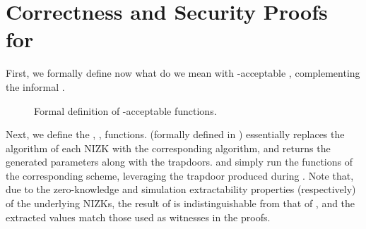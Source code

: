 \section{Correctness and Security Proofs for \CUASGen}
\label{app:uas-proofs}

First, we formally define now what do we mean with \UAS-acceptable \fissue,
complementing the informal . 

\begin{figure}[ht!]
  \centering  
  \label{fig:uas-acceptable}
  \caption{Formal definition of \UAS-acceptable \fissue functions.}
\end{figure}


Next, we define the \SimSetup, \ExtractIssue, \ExtractSign functions. \SimSetup
(formally defined in ) essentially replaces the
\Setup algorithm of each NIZK with the corresponding \NIZKSimSetup algorithm,
and returns the generated parameters along with the
trapdoors. \ExtractIssue and \ExtractSign simply run the \Extract functions
of the corresponding \NIZK scheme, leveraging the trapdoor produced during
\SimSetup. Note that, due to the zero-knowledge and simulation extractability
properties (respectively) of the underlying NIZKs, the result of \SimSetup
is indistinguishable from that of \Setup, and the extracted values match those
used as witnesses in the proofs.


